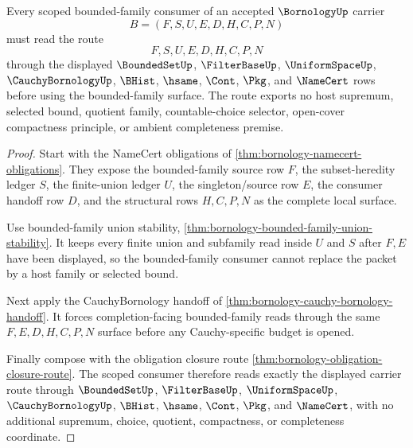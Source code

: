 \begin{theorem}
\label{thm:bornology-scoped-bounded-family-route}
Every scoped bounded-family consumer of an accepted $\BornologyUp$ carrier
$$
B=(F,S,U,E,D,H,C,P,N)
$$
must read the route
$$
F,S,U,E,D,H,C,P,N
$$
through the displayed $\BoundedSetUp$, $\FilterBaseUp$, $\UniformSpaceUp$, $\CauchyBornologyUp$, $\BHist$, $\hsame$, $\Cont$, $\Pkg$, and $\NameCert$ rows before using the bounded-family surface. The route exports no host supremum, selected bound, quotient family, countable-choice selector, open-cover compactness principle, or ambient completeness premise.
\end{theorem}
\begin{proof}
Start with the NameCert obligations of \autoref{thm:bornology-namecert-obligations}. They expose the bounded-family source row $F$, the subset-heredity ledger $S$, the finite-union ledger $U$, the singleton/source row $E$, the consumer handoff row $D$, and the structural rows $H,C,P,N$ as the complete local surface.

Use bounded-family union stability, \autoref{thm:bornology-bounded-family-union-stability}. It keeps every finite union and subfamily read inside $U$ and $S$ after $F,E$ have been displayed, so the bounded-family consumer cannot replace the packet by a host family or selected bound.

Next apply the CauchyBornology handoff of \autoref{thm:bornology-cauchy-bornology-handoff}. It forces completion-facing bounded-family reads through the same $F,E,D,H,C,P,N$ surface before any Cauchy-specific budget is opened.

Finally compose with the obligation closure route \autoref{thm:bornology-obligation-closure-route}. The scoped consumer therefore reads exactly the displayed carrier route through $\BoundedSetUp$, $\FilterBaseUp$, $\UniformSpaceUp$, $\CauchyBornologyUp$, $\BHist$, $\hsame$, $\Cont$, $\Pkg$, and $\NameCert$, with no additional supremum, choice, quotient, compactness, or completeness coordinate.
\end{proof}

